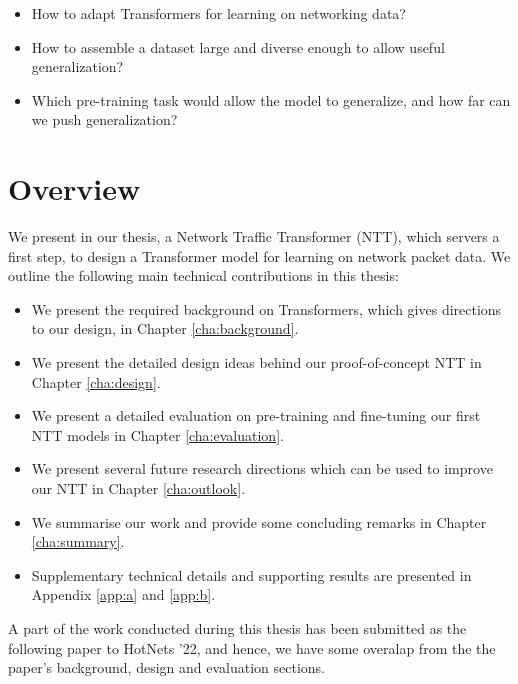 \begin{itemize}
    \item
          How to adapt Transformers for learning on networking data?
    \item
          How to assemble a dataset large and diverse enough to allow useful generalization?
    \item
          Which pre-training task would allow the model to generalize, and how far can we push generalization?
\end{itemize}

\section{Overview}
\label{sec:overview}

We present in our thesis, a Network Traffic Transformer (NTT), which servers a first step, to design a Transformer model for learning on network packet data. We outline the following main technical contributions in this thesis:

\begin{itemize}
\item We present the required background on Transformers, which gives directions to our design, in Chapter \ref{cha:background}.
\item We present the detailed design ideas behind our proof-of-concept NTT in Chapter \ref{cha:design}.
\item We present a detailed evaluation on pre-training and fine-tuning our first NTT models in Chapter \ref{cha:evaluation}.
\item We present several future research directions which can be used to improve our NTT in Chapter \ref{cha:outlook}.
\item We summarise our work and provide some concluding remarks in Chapter \ref{cha:summary}.
\item Supplementary technical details and supporting results are presented in Appendix \ref{app:a} and \ref{app:b}. 
\end{itemize}

A part of the work conducted during this thesis has been submitted as the following paper\cite{newhope} to HotNets '22, and hence, we have some overalap from the the paper's background, design and evaluation sections.

